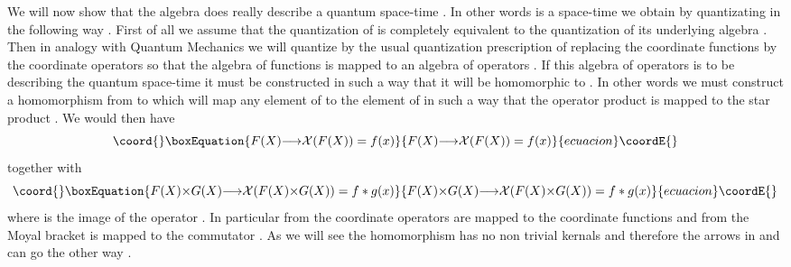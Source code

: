 \documentclass[a4paper,12pt]{article}
\let\oldtheequation=\theequation
\def\doteqs#1{\setcounter{equation}{0}
            \def\theequation{{#1}.\oldtheequation}}
\newcounter{sxn}
\def\sx#1{\addtocounter{sxn}{1}
\medskip \goodbreak
\noindent{\large\bf
\centerline{\thesxn.~~#1}} \nobreak \medskip}
\def\sxn#1{\sx{#1} \doteqs{\thesxn}}
\begin{document}
 \vskip 5mm \sxn{Quantum Space-Time}
\vskip 5mm  \vskip 5mm \noindent
We will now show that the algebra \coordHE{} does really
describe a quantum space-time . In other words \coordHE{} is a
space-time we obtain by quantizating \coordHE{} in the following way .
First of all we assume that the quantization of \coordHE{} is
completely equivalent to the quantization of its underlying
algebra \coordHE{} \cite{madore,landi}. Then in analogy with
Quantum Mechanics we will quantize \coordHE{} by the usual
quantization prescription of replacing the coordinate functions
\coordHE{} by the coordinate operators \coordHE{} so that the
algebra of functions \coordHE{} is mapped to an algebra of
operators \coordHE{} \cite{dop}. If this algebra of operators
\coordHE{} is to be describing the quantum space-time \coordHE{} it
must be constructed in such a way that it will be homomorphic to
\coordHE{} . In other words we must construct a homomorphism
\coordHE{} from \coordHE{} to \coordHE{} which will map any
element \coordHE{} of \coordHE{} to the element \coordHE{} of \coordHE{} in
such a way that the operator product \coordHE{} is mapped
to the star product \coordHE{} . We would then have
\begin{equation}\coord{}\boxEquation{
F(X){\longrightarrow}{\cal X}(F(X))=f(x)
}{
F(X){\longrightarrow}{\cal X}(F(X))=f(x)
}{ecuacion}\coordE{}\end{equation}
together with
\begin{equation}\coord{}\boxEquation{
F(X){\times}G(X){\longrightarrow}{\cal X}(F(X){\times}G(X))=f*g(x)
}{
F(X){\times}G(X){\longrightarrow}{\cal X}(F(X){\times}G(X))=f*g(x)
}{ecuacion}\coordE{}\end{equation}
where \coordHE{} is the image of the operator \coordHE{} . In particular
from \coordHE{} the coordinate operators \coordHE{} are mapped to the
coordinate functions \coordHE{} and from \coordHE{} the Moyal
bracket\coordHE{} is mapped to the commutator
\coordHE{}\cite{merkulov}. As we will
see the homomorphism \coordHE{} has no non trivial kernals and
therefore the arrows in \coordHE{} and \coordHE{} can go the other way .
\end{document}
